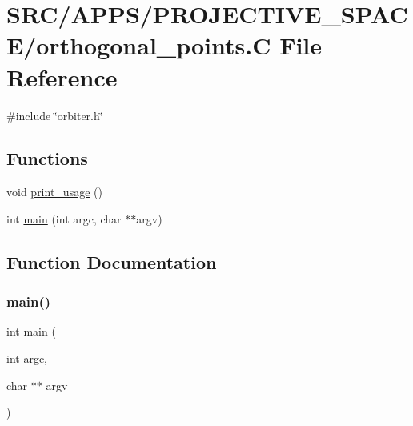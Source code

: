 \hypertarget{_a_p_p_s_2_p_r_o_j_e_c_t_i_v_e___s_p_a_c_e_2orthogonal__points_8_c}{}\section{S\+R\+C/\+A\+P\+P\+S/\+P\+R\+O\+J\+E\+C\+T\+I\+V\+E\+\_\+\+S\+P\+A\+C\+E/orthogonal\+\_\+points.C File Reference}
\label{_a_p_p_s_2_p_r_o_j_e_c_t_i_v_e___s_p_a_c_e_2orthogonal__points_8_c}
{\ttfamily \#include \char`\"{}orbiter.\+h\char`\"{}}\newline
\subsection*{Functions}
\begin{DoxyCompactItemize}
\item 
void \mbox{\hyperlink{_a_p_p_s_2_p_r_o_j_e_c_t_i_v_e___s_p_a_c_e_2orthogonal__points_8_c_ae5ad5cbeccaedc03a48d3c7eaa803e79}{print\+\_\+usage}} ()
\item 
int \mbox{\hyperlink{_a_p_p_s_2_p_r_o_j_e_c_t_i_v_e___s_p_a_c_e_2orthogonal__points_8_c_a3c04138a5bfe5d72780bb7e82a18e627}{main}} (int argc, char $\ast$$\ast$argv)
\end{DoxyCompactItemize}


\subsection{Function Documentation}
\mbox{\label{_a_p_p_s_2_p_r_o_j_e_c_t_i_v_e___s_p_a_c_e_2orthogonal__points_8_c_a3c04138a5bfe5d72780bb7e82a18e627}} 
\subsubsection{\texorpdfstring{main()}{main()}}
{\footnotesize\ttfamily int main (\begin{DoxyParamCaption}\item[{int}]{argc,  }\item[{char $\ast$$\ast$}]{argv }\end{DoxyParamCaption})}

